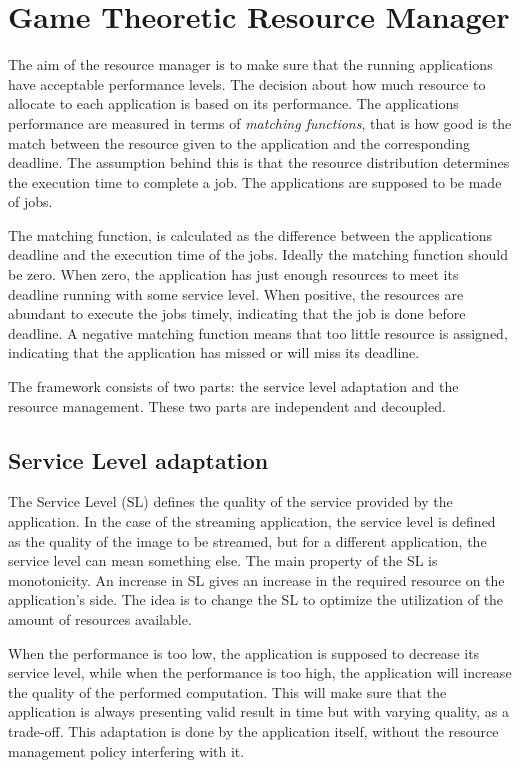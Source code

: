 \documentclass[nobiblatex]{LTHthesis}
\begin{document}
\section{Game Theoretic Resource Manager}

The aim of the resource manager is to make sure that the running applications
have acceptable performance levels. The decision about how much resource to
allocate to each application is based on its performance. The applications
performance are measured in terms of \emph{matching functions}, that is how
good is the match between the resource given to the application and the
corresponding deadline. The assumption behind this is that the resource
distribution determines the execution time to complete a job. The applications
are supposed to be made of jobs. 

The matching function, is calculated as the difference between the
applications deadline and the execution time of the jobs. Ideally the matching
function should be zero. When zero, the application has just enough resources
to meet its deadline running with some service level. When positive, the
resources are abundant to execute the jobs timely, indicating that the job
is done before deadline. A negative matching function means that too little
resource is assigned, indicating that the application has missed or will miss
its deadline.

The framework consists of two parts: the service level adaptation and the
resource management. These two parts are independent and decoupled.

\subsection{Service Level adaptation}

The Service Level (SL) defines the quality of the service provided by the 
application. In the case of the streaming application, the service level
is defined as the quality of the image to be streamed, but for a different
application, the service level can mean something else. The main property of
the SL is monotonicity. An increase in SL gives an increase in the required
resource on the application's side. The idea is to change the SL to optimize
the utilization of the amount of resources available. 

When the performance is too low, the application is supposed to decrease its
service level, while when the performance is too high, the application will
increase the quality of the performed computation. This will make sure that
the application is always presenting valid result in time but with varying
quality, as a trade-off. This adaptation is done by the application itself,
without the resource management policy interfering with it.
\end{document}
